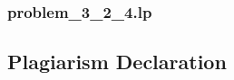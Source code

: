 \documentclass[12pt]{article} %
\begin{document}
\subsubsection{problem\_3\_2\_4.lp}
% 


\subsection{Plagiarism Declaration}

\end{document}
